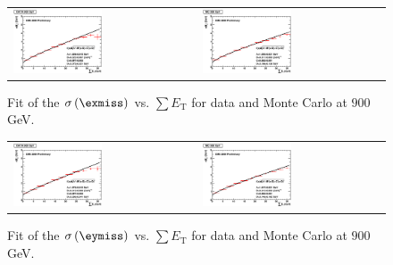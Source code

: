 \begin{figure}[h!]
 \centering
 \begin{tabular}{ll}
  \includegraphics[width=0.5\textwidth]{plots_DataVsMC_MB_900GeV/final_metxsigma_sumet_DATA_900.eps} &
  \includegraphics[width=0.5\textwidth]{plots_DataVsMC_MB_900GeV/final_metxsigma_sumet_MC_900.eps} \\
 \end{tabular}
 \caption{\small Fit of the $\sigma\left(\exmiss\right)$ vs. $\sum E_\text{T}$ for data and Monte Carlo at $900$ GeV.\label{fig:MExSigma_vs_SumET_900_fit}}
\end{figure}

\begin{figure}[h!]
 \centering
 \begin{tabular}{ll}
  \includegraphics[width=0.5\textwidth]{plots_DataVsMC_MB_900GeV/final_metysigma_sumet_DATA_900.eps} &
  \includegraphics[width=0.5\textwidth]{plots_DataVsMC_MB_900GeV/final_metysigma_sumet_MC_900.eps} \\
 \end{tabular}
 \caption{\small Fit of the $\sigma\left(\eymiss\right)$ vs. $\sum E_\text{T}$ for data and Monte Carlo at $900$ GeV.\label{fig:MEySigma_vs_SumET_900_fit}}
\end{figure}


